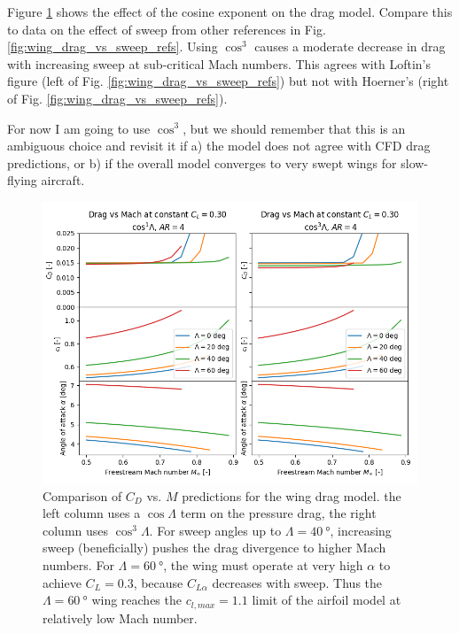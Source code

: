 \documentclass[12pt]{article}
\begin{document}
Figure \ref{fig:wing_model_drag_cos_exp} shows the effect of the cosine exponent on the drag model. Compare this to data on the effect of sweep from other references in Fig. \ref{fig:wing_drag_vs_sweep_refs}. Using $\cos^3$ causes a moderate decrease in drag with increasing sweep at sub-critical Mach numbers. This agrees with Loftin's figure (left of Fig. \ref{fig:wing_drag_vs_sweep_refs}) but not with Hoerner's (right of Fig. \ref{fig:wing_drag_vs_sweep_refs}).

For now I am going to use $\cos^3$, but we should remember that this is an ambiguous choice and revisit it if a) the model does not agree with CFD drag predictions, or b) if the overall model converges to very swept wings for slow-flying aircraft.


\begin{figure}[hbt!]
    \centering
    \includegraphics[width=\textwidth]{figures/wing_drag_model/drag_cos_exp}
    \caption{\label{fig:wing_model_drag_cos_exp} Comparison of $C_D$ vs. $M$ predictions for the wing drag model. the left column uses a $\cos\Lambda$ term on the pressure drag, the right column uses $\cos^3 \Lambda$. For sweep angles up to $\Lambda = \SI{40}{\degree}$, increasing sweep (beneficially) pushes the drag divergence to higher Mach numbers. For $\Lambda = \SI{60}{\degree}$, the wing must operate at very high $\alpha$ to achieve $C_L=0.3$, because $C_{L\alpha}$ decreases with sweep. Thus the $\Lambda = \SI{60}{\degree}$ wing reaches the $c_{l, max} = 1.1$ limit of the airfoil model at relatively low Mach number.}
\end{figure}
\end{document}
